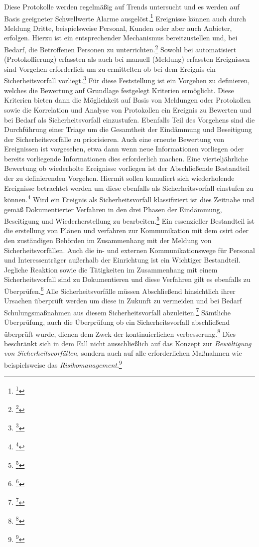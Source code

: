 \documentclass[11pt,a4paper,hidelinks]{article}   %
\begin{document}
            Diese Protokolle werden regelmäßig auf Trends untersucht und es werden auf Basis geeigneter Schwellwerte Alarme ausgelöst.\footnote{\footcite[Vgl.][, Anhang, Nummer 3.2.4.]{EU2024-2690}} Ereignisse können auch durch Meldung Dritte, beispielsweise Personal, Kunden oder aber auch Anbieter, erfolgen. Hierzu ist ein entsprechender Mechanismus bereitzustellen und, bei Bedarf, die Betroffenen Personen zu unterrichten.\footnote{\footcite[Vgl.][, Anhang, Nummer 3.3.1.]{EU2024-2690}} Sowohl bei automatisiert (Protokollierung) erfassten als auch bei manuell (Meldung) erfassten Ereignissen sind Vorgehen erforderlich um zu ermittelten ob bei dem Ereignis ein Sicherheitsvorfall vorliegt.\footnote{\footcite[Vgl.][, Anhang, Nummer 3.4.1.]{EU2024-2690}} Für diese Feststellung ist ein Vorgehen zu definieren, welches die Bewertung auf Grundlage festgelegt Kriterien ermöglicht. Diese Kriterien bieten dann die Möglichkeit auf Basis von Meldungen oder Protokollen sowie die Korrelation und Analyse von Protokollen ein Ereignis zu Bewerten und bei Bedarf als Sicherheitsvorfall einzustufen. Ebenfalls Teil des Vorgehens sind die Durchführung einer Triage um die Gesamtheit der Eindämmung und Beseitigung der Sicherheitsvorfälle zu priorisieren. Auch eine erneute Bewertung von Ereignissen ist vorgesehen, etwa dann wenn neue Informationen vorliegen oder bereits vorliegende Informationen dies erforderlich machen. Eine vierteljährliche Bewertung ob wiederholte Ereignisse vorliegen ist der Abschließende Bestandteil der zu definierenden Vorgehen. Hiermit sollen kumuliert sich wiederholende Ereignisse betrachtet werden um diese ebenfalls als Sicherheitsvorfall einstufen zu können.\footnote{\footcite[Vgl.][, Anhang, Nummer 3.4.2.]{EU2024-2690}} Wird ein Ereignis als Sicherheitsvorfall klassifiziert ist dies Zeitnahe und gemäß Dokumentierter Verfahren in den drei Phasen der Eindämmung, Beseitigung und Wiederherstellung zu bearbeiten.\footnote{\footcite[Vgl.][, Anhang, Nummer 3.5.1., 3.5.2. \& 3.5.4.]{EU2024-2690}} Ein essenzieller Bestandteil ist die erstellung von Plänen und verfahren zur Kommunikation mit dem \gls{csirt} oder den zuständigen Behörden im Zusammenhang mit der Meldung von Sicherheitsvorfällen. Auch die in- und externen Kommunikationswege für Personal und Interessenträger außerhalb der Einrichtung ist ein Wichtiger Bestandteil. Jegliche Reaktion sowie die Tätigkeiten im Zusammenhang mit einem Sicherheitsvorfall sind zu Dokumentieren und diese Verfahren gilt es ebenfalls zu Überprüfen.\footnote{\footcite[Vgl.][, Anhang, Nummer 3.5.3.]{EU2024-2690}} Alle Sicherheitsvorfälle müssen Abschließend hinsichtlich ihrer Ursachen überprüft werden um diese in Zukunft zu vermeiden und bei Bedarf Schulungsmaßnahmen aus diesem Sicherheitsvorfall abzuleiten.\footnote{\footcite[Vgl.][, Anhang, Nummer 3.6.1.]{EU2024-2690}} Sämtliche Überprüfung, auch die Überprüfung ob ein Sicherheitsvorfall abschließend überprüft wurde, dienen dem Zwek der kontinuierlichen verbesserung.\footnote{\footcite[Vgl.][, Anhang, Nummer 3.6.2.]{EU2024-2690}} Dies beschränkt sich in dem Fall nicht ausschließlich auf das Konzept zur \emph{Bewältigung von Sicherheitsvorfällen}, sondern auch auf alle erforderlichen Maßnahmen wie beispielsweise das \emph{Risikomanagement}.\footnote{
                \footcite[Vgl.][, Artikel 4]{EU2024-2690}
            }
\end{document}
